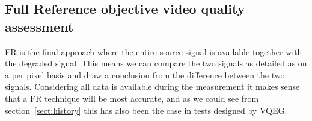 
\subsection{Full Reference objective video quality assessment}\label{sect:fr}
FR is the final approach where the entire source signal is available together with the degraded signal. This means we can compare the two signals as detailed as on a per pixel basis and draw a conclusion from the difference between the two signals. Considering all data is available during the measurement it makes sense that a FR technique will be most accurate, and as we could see from section~\ref{sect:history} this has also been the case in tests designed by VQEG. 
